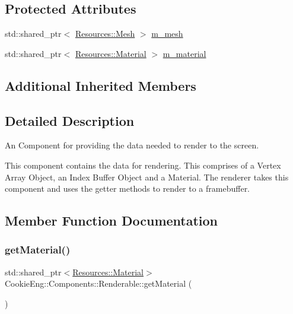 \subsection*{Protected Attributes}
\begin{DoxyCompactItemize}
\item 
std\+::shared\+\_\+ptr$<$ \hyperlink{struct_cookie_eng_1_1_resources_1_1_mesh}{Resources\+::\+Mesh} $>$ \hyperlink{class_cookie_eng_1_1_components_1_1_renderable_a9da5e010c1d6c0ccb008b2af664b925a}{m\+\_\+mesh}
\item 
std\+::shared\+\_\+ptr$<$ \hyperlink{class_cookie_eng_1_1_resources_1_1_material}{Resources\+::\+Material} $>$ \hyperlink{class_cookie_eng_1_1_components_1_1_renderable_a69e36f6c8b8d58c978d86f2591c53ec5}{m\+\_\+material}
\end{DoxyCompactItemize}
\subsection*{Additional Inherited Members}


\subsection{Detailed Description}
An Component for providing the data needed to render to the screen. 

This component contains the data for rendering. This comprises of a Vertex Array Object, an Index Buffer Object and a Material. The renderer takes this component and uses the getter methods to render to a framebuffer. 

\subsection{Member Function Documentation}
\mbox{\label{class_cookie_eng_1_1_components_1_1_renderable_a578ffbbc5b4245ade613d0dcfa571413}} 
\subsubsection{\texorpdfstring{get\+Material()}{getMaterial()}}
{\footnotesize\ttfamily std\+::shared\+\_\+ptr$<$\hyperlink{class_cookie_eng_1_1_resources_1_1_material}{Resources\+::\+Material}$>$ Cookie\+Eng\+::\+Components\+::\+Renderable\+::get\+Material (\begin{DoxyParamCaption}{ }\end{DoxyParamCaption})\hspace{0.3cm}{\ttfamily [inline]}}



